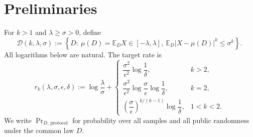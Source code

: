 \section{Preliminaries}\label{sec:preliminaries}

For \(k>1\) and \(\lambda\geq\sigma>0\), define
\[
\mathcal D(k,\lambda,\sigma)
:=\left\{D:\ \mu(D)=\mathbb E_DX\in[-\lambda,\lambda],\
\mathbb E_D|X-\mu(D)|^k\leq\sigma^k\right\}.
\]
All logarithms below are natural.  The target rate is
\[
r_k(\lambda,\sigma,\epsilon,\delta)
:=\log\frac{\lambda}{\sigma}
+\begin{cases}
\dfrac{\sigma^2}{\epsilon^2}\log\dfrac1\delta,&k>2,\\[0.6em]
\dfrac{\sigma^2}{\epsilon^2}
\log\dfrac{\sigma}{\epsilon}\log\dfrac1\delta,&k=2,\\[0.6em]
\left(\dfrac{\sigma}{\epsilon}\right)^{k/(k-1)}
\log\dfrac1\delta,&1<k<2.
\end{cases}
\]
We write \(\Pr_{D,\,\mathrm{protocol}}\) for probability over all samples
and all public randomness under the common law \(D\).
